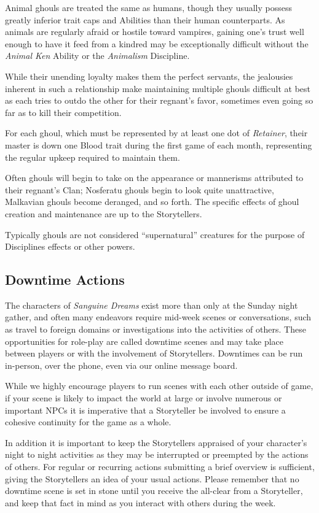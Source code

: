 Animal ghouls are treated the same as humans, though they usually possess greatly inferior 
trait caps and Abilities than their human counterparts.  As animals are regularly afraid or 
hostile toward vampires, gaining one's trust well enough to have it feed from a kindred may be 
exceptionally difficult without the \emph{Animal Ken} Ability or the \emph{Animalism} Discipline.

While their unending loyalty makes them the perfect servants, the jealousies inherent in 
such a relationship make maintaining multiple ghouls difficult at best as each tries to outdo 
the other for their regnant's favor, sometimes even going so far as to kill their competition.

For each ghoul, which must be represented by at least one dot of \emph{Retainer}, their master 
is down one Blood trait during the first game of each month, representing the regular upkeep 
required to maintain them.

Often ghouls will begin to take on the appearance or mannerisms attributed to their regnant's 
Clan; Nosferatu ghouls begin to look quite unattractive, Malkavian ghouls become deranged, and 
so forth.  The specific effects of ghoul creation and maintenance are up to the Storytellers.

Typically ghouls are not considered ``supernatural'' creatures for the purpose of Disciplines 
effects or other powers.

\subsection{Downtime Actions}
The characters of \emph{Sanguine Dreams} exist more than only at the Sunday night gather, 
and often many endeavors require mid-week scenes or conversations, such as travel to foreign 
domains or investigations into the activities of others.  These opportunities for role-play 
are called downtime scenes and may take place between players or with the involvement of 
Storytellers.  Downtimes can be run in-person, over the phone, even via our online message 
board.

While we highly encourage players to run scenes with each other outside of game, if your 
scene is likely to impact the world at large or involve numerous or important NPCs it is 
imperative that a Storyteller be involved to ensure a cohesive continuity for the game 
as a whole.

In addition it is important to keep the Storytellers appraised of your character's night 
to night activities as they may be interrupted or preempted by the actions of others.  For 
regular or recurring actions submitting a brief overview is sufficient, giving the 
Storytellers an idea of your usual actions.  Please remember that no downtime scene is set 
in stone until you receive the all-clear from a Storyteller, and keep that fact in mind as 
you interact with others during the week.

